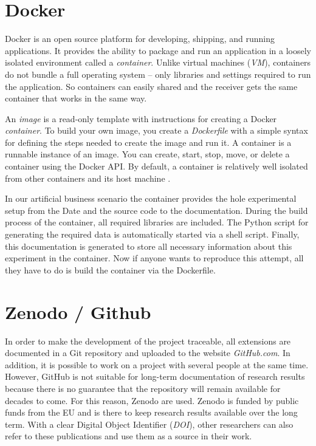 \documentclass{article}
\begin{document}
\begin{multicols}{2}
\section{Docker} \label{sec:Docker}
Docker is an open source platform for developing, shipping, and running applications. It provides the ability to package and run an application in a loosely isolated environment called a \textit{container}. Unlike virtual machines (\textit{VM}), containers do not bundle a full operating system -- only libraries and settings required to run the application. So containers can easily shared and the receiver gets the same container that works in the same way.

An \textit{image} is a read-only template with instructions for creating a Docker \textit{container}. To build your own image, you create a \textit{Dockerfile} with a simple syntax for defining the steps needed to create the image and run it. A container is a runnable instance of an image. You can create, start, stop, move, or delete a container using the Docker API. By default, a container is relatively well isolated from other containers and its host machine \cite{Docker}. 

In our artificial business scenario the container provides the hole experimental setup from the Date and the source code to the documentation. During the build process of the container, all required libraries are included. The Python script for generating the required data is automatically started via a shell script. Finally, this documentation is generated to store all necessary information about this experiment in the container. Now if anyone wants to reproduce this attempt, all they have to do is build the container via the Dockerfile. 

\section{Zenodo / Github}
In order to make the development of the project traceable, all extensions are documented in a Git repository and uploaded to the website \textit{GitHub.com}. In addition, it is possible to work on a project with several people at the same time. However, GitHub is not suitable for long-term documentation of research results because there is no guarantee that the repository will remain available for decades to come. For this reason, Zenodo are used.
Zenodo is funded by public funds from the EU and is there to keep research results available over the long term. With a clear Digital Object Identifier (\textit{DOI}), other researchers can also refer to these publications and use them as a source in their work.



\end{multicols}
\end{document}
